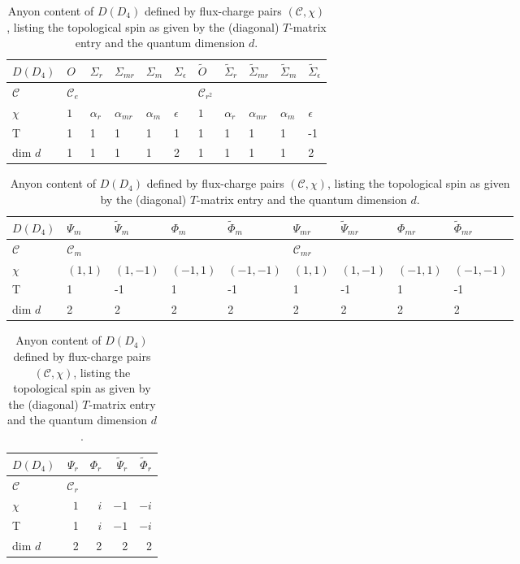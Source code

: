 \documentclass[a4paper,twocolumn,11pt, accepted=2024-06-14]{quantumarticle}
\begin{document}
\begin{table}
\centering
\begin{subtable}{\textwidth}
\raggedright
\begin{tabular}{l||lllll|lllll}

$D(D_4)$  & $O$     & $\Sigma_{r}$ & $\Sigma_{mr}$ & $\Sigma_{m}$ & $\Sigma_{\epsilon}$ & $\tilde{O}$ & $\tilde{\Sigma}_{r}$ & $\tilde{\Sigma}_{mr}$ & $\tilde{\Sigma}_{m}$ & $\tilde{\Sigma}_{\epsilon}$ 
\\ \hline
$\mathcal C$    & $\mathcal C_e$ &       &       &       &              &   $\mathcal C_{r^2}$     &           &       &           &                \\ $\chi$ & $1$ & $\alpha_{r}$ & $\alpha_{mr}$ & $\alpha_{m}$ & $\epsilon$          & $1$     & $\alpha_{r}$         & $\alpha_{mr}$         & $\alpha_{m}$         & $\epsilon$                  \\ 
\hline 
T & 1 & 1 & 1 & 1 & 1 & 1 & 1 & 1 & 1 & -1\\
dim $d$ & 1 & 1 & 1 & 1 & 2 & 1 & 1 & 1 & 1& 2
\end{tabular}
\end{subtable}

\vspace{0.5cm}
\medskip
\begin{subtable}{\textwidth}
\begin{tabular}{l||llll|llll}
$D(D_4)$  & $\Psi_{m}$ & $\tilde{\Psi}_{m}$ & $\Phi_{m}$ & $\tilde{\Phi}_{m}$ & $\Psi_{mr}$ & $\tilde{\Psi}_{mr}$ & $\Phi_{mr}$ & $\tilde{\Phi}_{mr}$ \\ \hline
$\mathcal C$    & $\mathcal C_m$    &          &    &            & $\mathcal C_{mr}$    &           &   &           \\ %
$\chi$ & $(1,1)$    & $(1,-1)$              & $(-1,1)$    & $(-1,-1)$              &$(1,1)$    & $(1,-1)$              & $(-1,1)$    & $(-1,-1)$             \\ \hline
T  & 1 & -1 & 1 & -1 & 1 & -1 & 1 & -1 \\
dim $d$ & 2 & 2 & 2 & 2 & 2 & 2 & 2 & 2 
\end{tabular}
\end{subtable}
\medskip

\vspace{0.5cm}
\begin{subtable}{\textwidth}
\raggedright
\begin{tabular}{l||rrrr}
$D(D_4)$  & $\Psi_{r}$ &  $\Phi_{r}$ & $\tilde{\Psi}_{r}$ & $\tilde{\Phi}_{r}$ \\ \hline
$\mathcal C$    & $\mathcal C_r$    &            &    &             \\ %
$\chi$ & $1$    & $ i$              & $-1$     & $- i$   \\           %
\hline
T  & 1 & $i$ & $-1$ & $-i$ \\
dim $d$ & 2 & 2 & 2 & 2
\end{tabular}
\end{subtable} 
\caption{  Anyon content of $D(D_4)$ defined by flux-charge pairs $(\mathcal C,\chi)$, listing the topological spin as given by the (diagonal) $T$-matrix entry and the quantum dimension $d$. }\label{tab:anyons}
\end{table}
\end{document}
